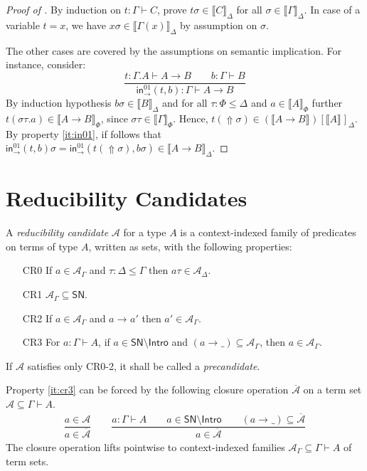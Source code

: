 \documentclass[a4paper,USenglish,cleveref, autoref, thm-restate]{lipics-v2019}
\makeatletter
\def\namedlabel#1#2{\begingroup
    #2%
    \def\@currentlabel{#2}%
    \phantomsection\label{#1}\endgroup
}
\newcommand{\den}[2][]{\llbracket#2\rrbracket^{#1}}
\newcommand{\ru}{\dfrac}
\newcommand{\Den}[2]{\den{#1}_{#2}}
\newcommand{\Gs}{\ensuremath{\sigma}}
\newcommand{\tin}{\ensuremath{\mathsf{in}}}
\newcommand{\inn}[2]{\ensuremath{\tin_{#1}^{#2}}}
\newcommand{\red}[1][]{\longrightarrow_{#1}}
\newcommand{\cl}[1]{\overline{#1}}
\newcommand{\A}{\mathcal{A}}
\newcommand{\SN}{\mathsf{SN}}
\newcommand{\Intro}{\mathsf{Intro}}
\newcommand{\Up}{\mathop{\Uparrow}}
\makeatother
\begin{document}
\begin{proof}[Proof of ]
  By induction on $t : \Gamma \vdash C$, prove $t\Gs \in \Den C \Delta$ for
  all $\Gs \in \Den \Gamma \Delta$.
  In case of a variable $t = x$, we have
  $x\Gs \in \Den{\Gamma(x)}\Delta$ by assumption on $\Gs$.

  The other cases are covered by the assumptions on semantic
  implication.  For instance, consider:
  \[
  \ru{t : \Gamma.A \vdash A \to B \qquad
      b : \Gamma \vdash B
    }{\inn\to{01}(t,b) : \Gamma \vdash A \to B
    }
  \]
  By induction hypothesis $b\sigma \in \Den B \Delta$ and
  for all $\tau : \Phi \leq \Delta$ and $a \in \Den A \Phi$
  further $t(\sigma\tau.a) \in \Den{A \to B}\Phi$,
  since $\sigma\tau \in \Den\Gamma\Phi$.
  Hence,
  $t(\Up\sigma) \in (\den{A \to B})[\den A]_\Delta$.  By property
  \ref{it:in01}, if follows that
  $\inn\to{01}(t,b)\sigma = \inn\to{01}(t(\Up\sigma),b\sigma) \in \Den{A \to B}\Delta$.
\end{proof}

\section{Reducibility Candidates}
\label{sec:cr}

A \emph{reducibility candidate} $\A$ for a type $A$ is a context-indexed
family of predicates on terms of type $A$, written as sets, with the following
properties:
\begin{itemize}[leftmargin=3em]
\item[\namedlabel{it:cr0}{CR0}]
  If $a \in \A_\Gamma$ and $\tau : \Delta \leq \Gamma$ then
  $a\tau \in \A_\Delta$.
\item[\namedlabel{it:cr1}{CR1}]
  $\A_\Gamma \subseteq \SN$.
\item[\namedlabel{it:cr2}{CR2}]
  If $a \in \A_\Gamma$ and $a \red a'$ then $a' \in \A_\Gamma$.
\item[\namedlabel{it:cr3}{CR3}]
  For $a : \Gamma \vdash A$, if $a \in \SN \setminus \Intro$
  and $(a \red \_) \subseteq \A_\Gamma$, then $a \in \A_\Gamma$.
\end{itemize}
If $\A$ satisfies only CR0-2, it shall be called a \emph{precandidate}.

Property \ref{it:cr3} can be forced by the following closure operation $\cl\A$
on a term set $\A \subseteq \Gamma \vdash A$.
\begin{gather*}
  \ru{a \in \A
    }{a \in \cl\A}
\qquad
  \ru{a : \Gamma \vdash A \qquad
      a \in \SN \setminus \Intro \qquad
      (a \red \_) \subseteq \cl\A
    }{a \in \cl\A}
\end{gather*}
The closure operation lifts pointwise to context-indexed families
$\A_\Gamma \subseteq \Gamma \vdash A$ of term sets.
\end{document}
